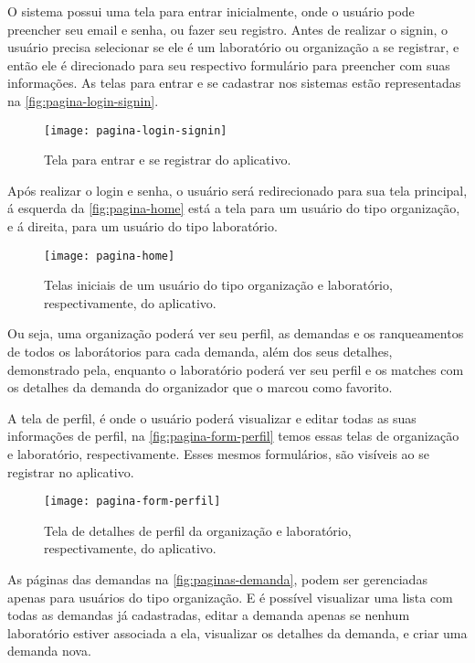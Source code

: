 O sistema possui uma tela para entrar inicialmente, onde o usuário pode preencher seu email e senha, ou fazer seu registro. Antes de realizar o signin, o usuário precisa selecionar se ele é um laboratório ou organização a se registrar, e então ele é direcionado para seu respectivo formulário para preencher com suas informações. As telas para entrar e se cadastrar nos sistemas estão representadas na \autoref{fig:pagina-login-signin}.

\begin{figure}[H]
  \captionsetup{width=0.43\textwidth}
  \caption{Tela para entrar e se registrar do aplicativo.}
  \label{fig:pagina-login-signin}
  \texttt{[image: pagina-login-signin]}
  \fonte{}
\end{figure}

Após realizar o login e senha, o usuário será redirecionado para sua tela principal, á esquerda da \autoref{fig:pagina-home} está a tela para um usuário do tipo organização, e á direita, para um usuário do tipo laboratório.

\begin{figure}[H]
  \captionsetup{width=0.43\textwidth}
  \caption{Telas iniciais de um usuário do tipo organização e laboratório, respectivamente, do aplicativo.}
  \label{fig:pagina-home}
  \texttt{[image: pagina-home]}
  \fonte{}
\end{figure}

Ou seja, uma organização poderá ver seu perfil, as demandas e os ranqueamentos de todos os laborátorios para cada demanda, além dos seus detalhes, demonstrado pela, enquanto o laboratório poderá ver seu perfil e os matches com os detalhes da demanda do organizador que o marcou como favorito.

A tela de perfil, é onde o usuário poderá visualizar e editar todas as suas informações de perfil, na \autoref{fig:pagina-form-perfil} temos essas telas de organização e laboratório, respectivamente. Esses mesmos formulários, são visíveis ao se registrar no aplicativo.

\begin{figure}[H]
  \captionsetup{width=0.43\textwidth}
  \caption{Tela de detalhes de perfil da organização e laboratório, respectivamente, do aplicativo.}
  \label{fig:pagina-form-perfil}
  \texttt{[image: pagina-form-perfil]}
  \fonte{}
\end{figure}

As páginas das demandas na \autoref{fig:paginas-demanda}, podem ser gerenciadas apenas para usuários do tipo organização. E é possível visualizar uma lista com todas as demandas já cadastradas, editar a demanda apenas se nenhum laboratório estiver associada a ela, visualizar os detalhes da demanda, e criar uma demanda nova.

